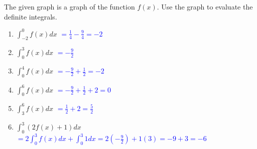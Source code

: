 \documentclass{ximera}
\begin{document}
\begin{exercise}
    The given graph is a graph of the function $f(x)$. Use the graph to evaluate the definite integrals.
    \begin{image}
    \end{image}
       \begin{enumerate}
        \item $\displaystyle \int_{-2}^{0} f(x)dx$ \textcolor{blue}{$=\frac{1}{4}-\frac{9}{4}=-2$}
        \item $ \displaystyle\int_{0}^3 f(x) dx$ \textcolor{blue}{ $=-\frac{9}{2}$}
        \item $\displaystyle\int_0^4f(x) dx$ \textcolor{blue}{ $=-\frac{9}{2}+\frac{1}{2}=-2$}
        \item $\displaystyle\int_0^6 f(x) dx$ \textcolor{blue}{ $=-\frac{9}{2}+\frac{1}{2}+2=0$}
        \item $\displaystyle\int_3^6 f(x)dx$ \textcolor{blue}{ $=\frac{1}{2}+2=\frac{5}{2}$}
        \item $\displaystyle\int_0^3 (2f(x)+1)dx$ \textcolor{blue}{ $\displaystyle =2\int_0^3f(x)dx+\int_0^3 1dx=2(-\frac{9}{2})+1(3)=-9+3=-6$}
    \end{enumerate} 
\end{exercise} 
    
\end{document}
